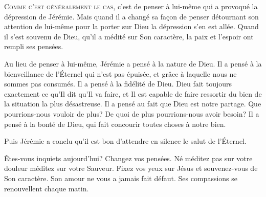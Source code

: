 



\lettrine{C}{omme c'est généralement le cas,} c'est de penser à lui-même
 qui a provoqué la dépression de Jérémie.
 Mais quand il a changé sa façon de penser
 \ocadr détournant son attention de lui-même pour la porter sur Dieu \fcadr{}
 la dépression s'en est allée. Quand il s'est souvenu de Dieu,
 qu'il a médité sur Son caractère, la paix et l'espoir ont rempli ses pensées. 


Au lieu de penser à lui-même, Jérémie a pensé à la nature de Dieu.
 Il a pensé à la bienveillance de l'Éternel qui n'est pas épuisée,
 et grâce à laquelle nous ne sommes pas consumés.
 Il a pensé à la fidélité de Dieu. Dieu fait toujours exactement
 ce qu'Il dit qu'Il va faire, et Il est capable de faire ressortir du bien
 de la situation la plus désastreuse. Il a pensé au fait que Dieu
 est notre partage. Que pourrions-nous vouloir de plus?
 De quoi de plus pourrions-nous avoir besoin?
 Il a pensé à la bonté de Dieu,
 qui fait concourir toutes choses à notre bien. 

Puis Jérémie a conclu qu'il est bon \og d'attendre en silence
 le salut de l'Éternel. \fg{}

Êtes-vous inquiets aujourd'hui? Changez vos pensées.
 Né méditez pas sur votre douleur \ocadr méditez sur votre Sauveur.
 Fixez vos yeux sur Jésus et souvenez-vous de Son caractère.
 Son amour ne vous a jamais fait défaut.
 Ses compassions se renouvellent chaque matin. 

\dvrule




